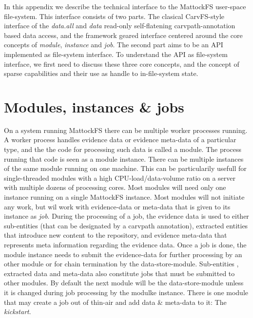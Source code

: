 In this appendix we describe the technical interface to the MattockFS user-space file-system. This interface consists of two parts. The clasical CarvFS-style interface of the \emph{data.all} and \emph{data} read-only self-flatening carvpath-annotation based data access, and the framework geared interface centered around the core concepts of \emph{module}, \emph{instance} and \emph{job}. The second part aims to be an API implemented as file-system interface. To understand the API as file-system interface, we first need to discuss these three core concepts, and the concept of sparse capabilities and their use as handle to in-file-system state.
\section{Modules, instances \& jobs}
On a system running MattockFS there can be multiple worker processes running. A worker process handles evidence data or evidence meta-data of a particular type, and the the code for processing such data is called a module. The process running that code is seen as a module instance. There can be multiple instances of the same module running on one machine. This can be particularily usefull for single-threaded modules with a high CPU-load/data-volume ratio on a server with multiple dozens of processing cores. Most modules will need only one instance running on a single MattockFS instance. Most modules will not initiate any work, but wil work with evidence-data or meta-data that is given to its instance as \emph{job}. During the processing of a job, the evidence data is used to either sub-entities (that can be designated by a carvpath annotation), extracted entities that introduce new content to the repository, and evidence meta-data that represents meta information regarding the evidence data. Once a job is done, the module instance needs to submit the evidence-data for further processing by an other module or for chain termination by the data-store-module. Sub-entities , extracted data and meta-data also constitute jobs that must be submitted to other modules. By default the next module will be the data-store-module unless it is changed during job processing by the modulke instance. There is one module that may create a job out of thin-air and add data \& meta-data to it: The \emph{kickstart}.
